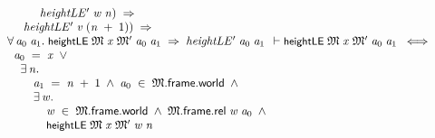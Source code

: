 \documentclass[letterpaper]{article}
\renewcommand{\HOLConst}[1]{{\textsf{\upshape\small #1}}}
\newenvironment{holmath}{\begin{displaymath}\begin{array}{l}}{\end{array}\end{displaymath}\ignorespacesafterend}
\begin{document}
\begin{holmath}
\;\;\;\;\;\;\;\;\;\;\;\;\;\;\;\HOLFreeVar{heightLE\sp{\prime}}\;\HOLBoundVar{w}\;\HOLBoundVar{n})\;\HOLSymConst{\HOLTokenImp{}}\\
\;\;\;\;\;\;\;\;\;\;\HOLFreeVar{heightLE\sp{\prime}}\;\HOLBoundVar{v}\;(\HOLBoundVar{n}\;\HOLSymConst{\ensuremath{+}}\;\HOLNumLit{1}))\;\HOLSymConst{\HOLTokenImp{}}\\
\;\;\;\;\;\HOLSymConst{\HOLTokenForall{}}\HOLBoundVar{a\sb{\mathrm{0}}}\;\HOLBoundVar{a\sb{\mathrm{1}}}.\;\HOLConst{heightLE}\;\HOLFreeVar{\ensuremath{\mathfrak{M}}}\;\HOLFreeVar{x}\;\HOLFreeVar{\ensuremath{\mathfrak{M}'}}\;\HOLBoundVar{a\sb{\mathrm{0}}}\;\HOLBoundVar{a\sb{\mathrm{1}}}\;\HOLSymConst{\HOLTokenImp{}}\;\HOLFreeVar{heightLE\sp{\prime}}\;\HOLBoundVar{a\sb{\mathrm{0}}}\;\HOLBoundVar{a\sb{\mathrm{1}}}
  \ensuremath{\HOLTokenTurnstile}\HOLConst{heightLE}\;\HOLFreeVar{\ensuremath{\mathfrak{M}}}\;\HOLFreeVar{x}\;\HOLFreeVar{\ensuremath{\mathfrak{M}'}}\;\HOLFreeVar{a\sb{\mathrm{0}}}\;\HOLFreeVar{a\sb{\mathrm{1}}}\;\HOLSymConst{\HOLTokenEquiv{}}\\
\;\;\;\;\;\;\;\HOLFreeVar{a\sb{\mathrm{0}}}\;\HOLSymConst{=}\;\HOLFreeVar{x}\;\HOLSymConst{\HOLTokenDisj{}}\\
\;\;\;\;\;\;\;\;\;\HOLSymConst{\HOLTokenExists{}}\HOLBoundVar{n}.\\
\;\;\;\;\;\;\;\;\;\;\;\;\;\HOLFreeVar{a\sb{\mathrm{1}}}\;\HOLSymConst{=}\;\HOLBoundVar{n}\;\HOLSymConst{\ensuremath{+}}\;\HOLNumLit{1}\;\HOLSymConst{\HOLTokenConj{}}\;\HOLFreeVar{a\sb{\mathrm{0}}}\;\HOLSymConst{\HOLTokenIn{}}\;\HOLFreeVar{\ensuremath{\mathfrak{M}}}.\HOLFieldName{frame}.\HOLFieldName{world}\;\HOLSymConst{\HOLTokenConj{}}\\
\;\;\;\;\;\;\;\;\;\;\;\;\;\HOLSymConst{\HOLTokenExists{}}\HOLBoundVar{w}.\\
\;\;\;\;\;\;\;\;\;\;\;\;\;\;\;\;\;\HOLBoundVar{w}\;\HOLSymConst{\HOLTokenIn{}}\;\HOLFreeVar{\ensuremath{\mathfrak{M}}}.\HOLFieldName{frame}.\HOLFieldName{world}\;\HOLSymConst{\HOLTokenConj{}}\;\HOLFreeVar{\ensuremath{\mathfrak{M}}}.\HOLFieldName{frame}.\HOLFieldName{rel}\;\HOLBoundVar{w}\;\HOLFreeVar{a\sb{\mathrm{0}}}\;\HOLSymConst{\HOLTokenConj{}}\\
\;\;\;\;\;\;\;\;\;\;\;\;\;\;\;\;\;\HOLConst{heightLE}\;\HOLFreeVar{\ensuremath{\mathfrak{M}}}\;\HOLFreeVar{x}\;\HOLFreeVar{\ensuremath{\mathfrak{M}'}}\;\HOLBoundVar{w}\;\HOLBoundVar{n}
\end{holmath}
\end{document}
